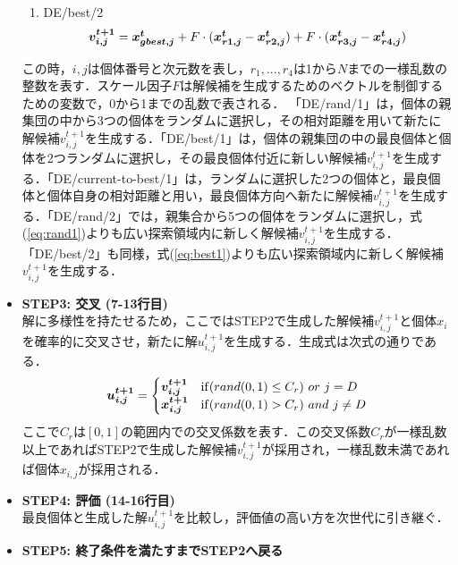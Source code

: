 \documentclass[a4j,11pt]{jarticle}
\begin{document}
\begin{itemize}
\begin{enumerate}
\item{DE/best/2}
\begin{equation}
\label{eq:best2}
\mbox{\boldmath $v_{i,j}^{t+1}$}=\mbox{\boldmath $x_{gbest,j}^t$}+F \cdot (\mbox{\boldmath $x_{r1,j}^t$}-\mbox{\boldmath $x_{r2,j}^t$})+F \cdot (\mbox{\boldmath $x_{r3,j}^t$}-\mbox{\boldmath $x_{r4,j}^t$})
\end{equation}
\end{enumerate}
この時，$i,j$は個体番号と次元数を表し，$r_1,...,r_4$は1から$N$までの一様乱数の整数を表す．スケール因子$F$は解候補を生成するためのベクトルを制御するための変数で，0から1までの乱数で表される．
「DE/rand/1」は，個体の親集団の中から3つの個体をランダムに選択し，その相対距離を用いて新たに解候補$v_{i,j}^{t+1}$を生成する．「DE/best/1」は，個体の親集団の中の最良個体と個体を2つランダムに選択し，その最良個体付近に新しい解候補$v_{i,j}^{t+1}$を生成する．「DE/current-to-best/1」は，ランダムに選択した2つの個体と，最良個体と個体自身の相対距離と用い，最良個体方向へ新たに解候補$v_{i,j}^{t+1}$を生成する．「DE/rand/2」では，親集合から5つの個体をランダムに選択し，式(\ref{eq:rand1})よりも広い探索領域内に新しく解候補$v_{i,j}^{t+1}$を生成する．「DE/best/2」も同様，式(\ref{eq:best1})よりも広い探索領域内に新しく解候補$v_{i,j}^{t+1}$を生成する．

\item {\bf STEP3: 交叉 (7-13行目)} \\
解に多様性を持たせるため，ここではSTEP2で生成した解候補$v_{i,j}^{t+1}$と個体$x_i$を確率的に交叉させ，新たに解$u_{i,j}^{t+1}$を生成する．生成式は次式の通りである．
\begin{equation}
\mbox{\boldmath $u_{i,j}^{t+1}$}=\begin{cases}
\mbox{\boldmath $v_{i,j}^{t+1}$} & {\rm if}(rand(0,1) \leq C_r) \ or \ j=D \\
\mbox{\boldmath $x_{i,j}^{t+1}$} & {\rm if}(rand(0,1) > C_r) \ and \ j \neq D
\end{cases}
\end{equation}
ここで$C_r$は$[0,1]$の範囲内での交叉係数を表す．この交叉係数$C_r$が一様乱数以上であればSTEP2で生成した解候補$v_{i,j}^{t+1}$が採用され，一様乱数未満であれば個体$x_{i,j}$が採用される．

\item {\bf STEP4: 評価 (14-16行目)} \\
最良個体と生成した解$u_{i,j}^{t+1}$を比較し，評価値の高い方を次世代に引き継ぐ．

\item {\bf STEP5: 終了条件を満たすまでSTEP2へ戻る}
\end{itemize}
\end{document}
